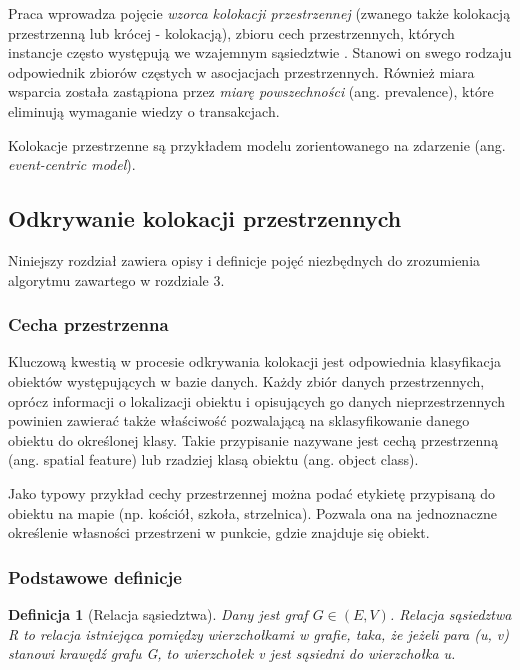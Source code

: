 \documentclass[12pt]{article}
\newtheorem{defin}{Definicja}
\begin{document}
Praca wprowadza pojęcie \textit{wzorca kolokacji przestrzennej} (zwanego także kolokacją przestrzenną lub krócej - kolokacją), zbioru cech przestrzennych, których instancje często występują we wzajemnym sąsiedztwie \cite{boinski}. Stanowi on swego rodzaju odpowiednik zbiorów częstych w asocjacjach przestrzennych. Również miara wsparcia została zastąpiona przez \textit{miarę powszechności} (ang. prevalence), które eliminują wymaganie wiedzy o transakcjach. 

Kolokacje przestrzenne są przykładem modelu zorientowanego na zdarzenie (ang. \textit{event-centric model}).

\subsection{Odkrywanie kolokacji przestrzennych}

Niniejszy rozdział zawiera opisy i definicje pojęć niezbędnych do zrozumienia algorytmu zawartego w rozdziale 3.

\subsubsection{Cecha przestrzenna}

Kluczową kwestią w procesie odkrywania kolokacji jest odpowiednia klasyfikacja obiektów występujących w bazie danych. Każdy zbiór danych przestrzennych, oprócz informacji o lokalizacji obiektu i opisujących go danych nieprzestrzennych powinien zawierać także właściwość pozwalającą na sklasyfikowanie danego obiektu do określonej klasy. Takie przypisanie nazywane jest cechą przestrzenną (ang. spatial feature) lub rzadziej klasą obiektu (ang. object class).

Jako typowy przykład cechy przestrzennej można podać etykietę przypisaną do obiektu na mapie (np. kościół, szkoła, strzelnica). Pozwala ona na jednoznaczne określenie własności przestrzeni w punkcie, gdzie znajduje się obiekt.

\subsubsection{Podstawowe definicje}

\begin{defin}[Relacja sąsiedztwa]
Dany jest graf $ G \in (E, V) $. Relacja sąsiedztwa R to relacja istniejąca pomiędzy wierzchołkami w grafie, taka, że jeżeli para (u, v) stanowi krawędź grafu G, to wierzchołek v jest sąsiedni do wierzchołka u. 
\end{defin}
\end{document}
